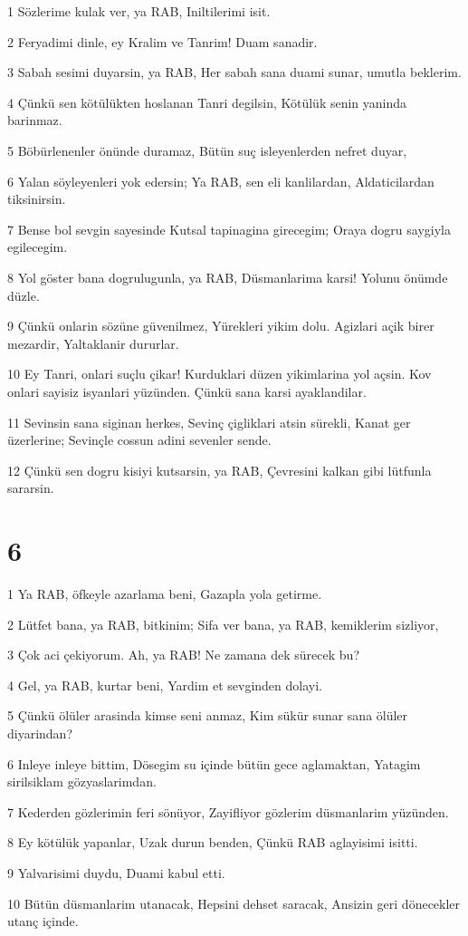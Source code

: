 \par 1 Sözlerime kulak ver, ya RAB, Iniltilerimi isit.
\par 2 Feryadimi dinle, ey Kralim ve Tanrim! Duam sanadir.
\par 3 Sabah sesimi duyarsin, ya RAB, Her sabah sana duami sunar, umutla beklerim.
\par 4 Çünkü sen kötülükten hoslanan Tanri degilsin, Kötülük senin yaninda barinmaz.
\par 5 Böbürlenenler önünde duramaz, Bütün suç isleyenlerden nefret duyar,
\par 6 Yalan söyleyenleri yok edersin; Ya RAB, sen eli kanlilardan, Aldaticilardan tiksinirsin.
\par 7 Bense bol sevgin sayesinde Kutsal tapinagina girecegim; Oraya dogru saygiyla egilecegim.
\par 8 Yol göster bana dogrulugunla, ya RAB, Düsmanlarima karsi! Yolunu önümde düzle.
\par 9 Çünkü onlarin sözüne güvenilmez, Yürekleri yikim dolu. Agizlari açik birer mezardir, Yaltaklanir dururlar.
\par 10 Ey Tanri, onlari suçlu çikar! Kurduklari düzen yikimlarina yol açsin. Kov onlari sayisiz isyanlari yüzünden. Çünkü sana karsi ayaklandilar.
\par 11 Sevinsin sana siginan herkes, Sevinç çigliklari atsin sürekli, Kanat ger üzerlerine; Sevinçle cossun adini sevenler sende.
\par 12 Çünkü sen dogru kisiyi kutsarsin, ya RAB, Çevresini kalkan gibi lütfunla sararsin.

\chapter{6}

\par 1 Ya RAB, öfkeyle azarlama beni, Gazapla yola getirme.
\par 2 Lütfet bana, ya RAB, bitkinim; Sifa ver bana, ya RAB, kemiklerim sizliyor,
\par 3 Çok aci çekiyorum. Ah, ya RAB! Ne zamana dek sürecek bu?
\par 4 Gel, ya RAB, kurtar beni, Yardim et sevginden dolayi.
\par 5 Çünkü ölüler arasinda kimse seni anmaz, Kim sükür sunar sana ölüler diyarindan?
\par 6 Inleye inleye bittim, Dösegim su içinde bütün gece aglamaktan, Yatagim sirilsiklam gözyaslarimdan.
\par 7 Kederden gözlerimin feri sönüyor, Zayifliyor gözlerim düsmanlarim yüzünden.
\par 8 Ey kötülük yapanlar, Uzak durun benden, Çünkü RAB aglayisimi isitti.
\par 9 Yalvarisimi duydu, Duami kabul etti.
\par 10 Bütün düsmanlarim utanacak, Hepsini dehset saracak, Ansizin geri dönecekler utanç içinde.

